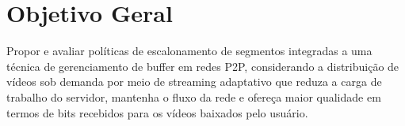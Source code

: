 \documentclass[
	12pt,				%
	oneside,			%
	a4paper,			%
	english,			%
	brazil				%
	]{abntex2ppgsi}
\begin{document}

\section{Objetivo Geral}

Propor e avaliar políticas de escalonamento de segmentos integradas a uma técnica de gerenciamento de buffer em redes P2P, considerando a distribuição de vídeos sob demanda por meio de streaming adaptativo que reduza a carga de trabalho do servidor, mantenha o fluxo da rede e ofereça maior qualidade em termos de bits recebidos para os vídeos baixados pelo usuário.




		
			


\end{document}
